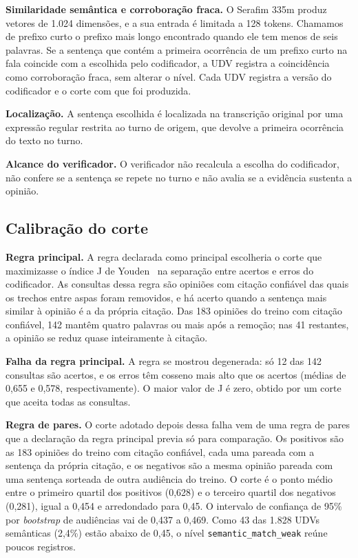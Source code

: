 \textbf{Similaridade semântica e corroboração fraca.} O Serafim 335m produz vetores de 1.024
dimensões, e a sua entrada é limitada a 128 tokens. Chamamos de prefixo curto o prefixo mais longo
encontrado quando ele tem menos de seis palavras. Se a sentença que contém a primeira ocorrência de
um prefixo curto na fala coincide com a escolhida pelo codificador, a UDV registra a coincidência
como corroboração fraca, sem alterar o nível. Cada UDV registra a versão do codificador e o corte com
que foi produzida.

\textbf{Localização.} A sentença escolhida é localizada na transcrição original por uma expressão
regular restrita ao turno de origem, que devolve a primeira ocorrência do texto no turno.

\textbf{Alcance do verificador.} O verificador não recalcula a escolha do codificador, não confere se
a sentença se repete no turno e não avalia se a evidência sustenta a opinião.

\subsection{Calibração do corte}
\label{ap:calibracao}

\textbf{Regra principal.} A regra declarada como principal escolheria o corte que maximizasse o
índice J de Youden~\citep{youden1950index} na separação entre acertos e erros do codificador. As
consultas dessa regra são opiniões com citação confiável das quais os trechos entre aspas foram
removidos, e há acerto quando a sentença mais similar à opinião é a da própria citação. Das 183
opiniões do treino com citação confiável, 142 mantêm quatro palavras ou mais após a remoção; nas 41
restantes, a opinião se reduz quase inteiramente à citação.

\textbf{Falha da regra principal.} A regra se mostrou degenerada: só 12 das 142 consultas são
acertos, e os erros têm cosseno mais alto que os acertos (médias de 0,655 e 0,578, respectivamente).
O maior valor de J é zero, obtido por um corte que aceita todas as consultas.

\textbf{Regra de pares.} O corte adotado depois dessa falha vem de uma regra de pares que a
declaração da regra principal previa só para comparação. Os positivos são as 183 opiniões do treino
com citação confiável, cada uma pareada com a sentença da própria citação, e os negativos são a mesma
opinião pareada com uma sentença sorteada de outra audiência do treino. O corte é o ponto médio entre
o primeiro quartil dos positivos (0,628) e o terceiro quartil dos negativos (0,281), igual a 0,454 e
arredondado para 0,45. O intervalo de confiança de 95\% por \textit{bootstrap} de audiências vai de
0,437 a 0,469. Como 43 das 1.828 UDVs semânticas (2,4\%) estão abaixo de 0,45, o nível
\texttt{semantic\_match\_weak} reúne poucos registros.

